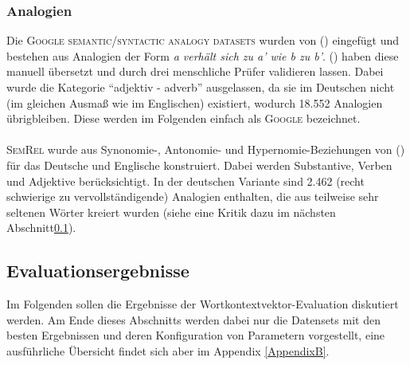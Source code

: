     \subsubsection{Analogien}

    Die \textsc{Google semantic/syntactic analogy datasets} wurden von (\cite{mikolov2013efficient}) eingefügt und bestehen
    aus Analogien der Form \emph{a verhält sich zu a' wie b zu b'}. (\cite{koper2015multilingual}) haben diese manuell übersetzt und durch
    drei menschliche Prüfer validieren lassen. Dabei wurde die Kategorie ``adjektiv - adverb'' ausgelassen, da sie
    im Deutschen nicht (im gleichen Ausmaß wie im Englischen) existiert, wodurch 18.552 Analogien übrigbleiben. Diese werden im Folgenden einfach als
    \textsc{Google} bezeichnet.\\ \\
    \textsc{SemRel} wurde aus Synonomie-, Antonomie- und Hypernomie-Beziehungen von (\cite{koper2015multilingual}) für das Deutsche und Englische
    konstruiert. Dabei werden Substantive, Verben und Adjektive berücksichtigt. In der deutschen Variante sind 2.462
    (recht schwierige zu vervollständigende) Analogien enthalten, die aus teilweise sehr seltenen Wörter kreiert wurden
    (siehe eine Kritik dazu im nächsten Abschnitt\ref{sec:evalerg}).

  \subsection{Evaluationsergebnisse}\label{sec:evalerg}

  Im Folgenden sollen die Ergebnisse der Wortkontextvektor-Evaluation diskutiert werden. Am Ende dieses Abschnitts werden dabei
  nur die Datensets mit den besten Ergebnissen und deren Konfiguration von Parametern vorgestellt, eine ausführliche
  Übersicht findet sich aber im Appendix \ref{AppendixB}.\\


